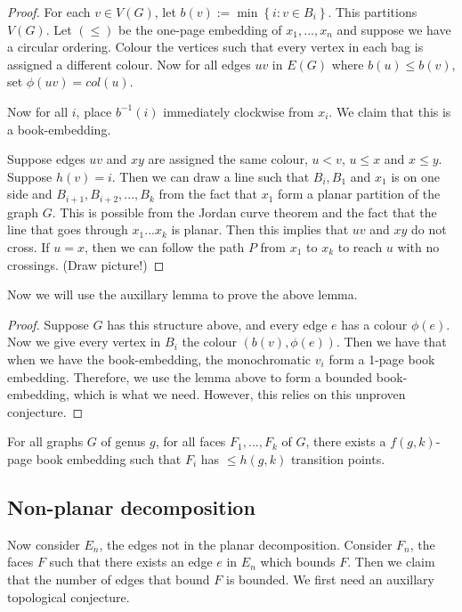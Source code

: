 \begin{proof}
	For each $v \in V(G)$, let $b(v) := \min \left\{ i : v \in B_i \right\}$. This partitions $V(G)$. Let $(\leq)$ be the one-page embedding of $x_1, ..., x_n$ and suppose we have a circular ordering. Colour the vertices such that every vertex in each bag is assigned a different colour. Now for all edges $uv$ in $E(G)$ where $b(u) \leq b(v) $, set $\phi(uv) = col(u)$. 
	
	Now for all $i$, place $b^{-1}(i)$ immediately clockwise from $x_i$. We claim that this is a book-embedding. 
	
	Suppose edges $uv$ and $xy$ are assigned the same colour, $u < v$, $u \leq x$ and $x \leq y$. Suppose $h(v) = i$. Then we can draw a line such that $B_i, B_1$ and $x_1$ is on one side and $B_{i + 1}, B_{i + 2}, ..., B_k$ from the fact that $x_1$ form a planar partition of the graph $G$. This is possible from the Jordan curve theorem and the fact that the line that goes through $x_1 ... x_k$ is planar. Then this implies that $uv$ and $xy$ do not cross. 
	If $u = x$, then we can follow the path $P$ from $x_1$ to $x_k$ to reach $u$ with no crossings. (Draw picture!)
\end{proof}

Now we will use the auxillary lemma to prove the above lemma.
\begin{proof}
	Suppose $G$ has this structure above, and every edge $e$ has a colour $\phi(e)$. 
	Now we give every vertex in $B_i$ the colour $(b(v),  \phi(e))$. Then we have that when we have the book-embedding, the monochromatic $v_i$ form a 1-page book embedding. Therefore, we use the lemma above to form a bounded book-embedding, which is what we need. However, this relies on this unproven conjecture.
\end{proof}

\begin{conjecture}
	For all graphs $G$ of genus $g$, for all faces $F_1, ..., F_k$ of $G$, there exists a $f(g, k)$-page book embedding such that $F_i$ has $\leq h(g, k)$ transition points. 
\end{conjecture}

\subsection{Non-planar decomposition}
Now consider $E_n$, the edges not in the planar decomposition. Consider $F_n$, the faces $F$ such that there exists an edge $e$ in $E_n$ which bounds $F$. Then we claim that the number of edges that bound $F$ is bounded. We first need an auxillary topological conjecture. 

